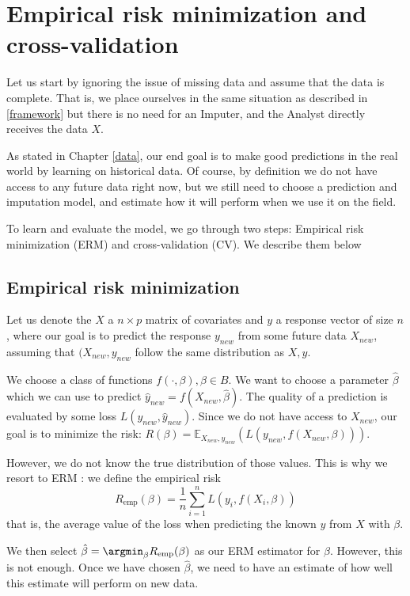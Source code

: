 	\section{Empirical risk minimization and cross-validation}
	\label{ERM}
Let us start by ignoring the issue of missing data and assume that the data is complete. That is, we place ourselves in the same situation as described in \ref{framework} but there is no need for an Imputer, and the Analyst directly receives the data $X$.
	
As stated in Chapter \ref{data}, our end goal is to make good predictions in the real world by learning on historical data. Of course, by definition we do not have access to any future data right now, but we still need to choose a prediction and imputation model, and estimate how it will perform when we use it on the field. 

To learn and evaluate the model, we go through two steps: Empirical risk minimization (ERM) and cross-validation (CV). We describe them below
		\subsection{Empirical risk minimization}
Let us denote the $X$ a $n \times p$ matrix of covariates and $y$ a response vector of size $n$, where our goal is to predict the response $y_{new}$ from some future data $X_{new}$, assuming that $(X_{new}, y_{new}$ follow the same distribution as $X,y$. 

We choose a class of functions $f(\cdot, \beta), \beta \in B$. We want to choose a parameter $\hat{\beta}$ which we can use to predict $\hat{y}_{new} = f(X_{new}, \hat{\beta})$.  The quality of a prediction is evaluated by some loss $L(y_{new},\hat{y}_{new})$. Since we do not have access to $X_{new}$, our goal is to minimize the risk: $R(\beta) = \mathbb{E}_{X_{new},y_{new}}(L(y_{new}, f(X_{new}, \beta)))$.

However, we do not know the true distribution of those values. This is why we resort to ERM \cite{ERM}: we define the empirical risk
$$ R_{\text{emp}}(\beta) = \frac{1}{n} \sum\limits_{i=1}^n L(y_i, f(X_i, \beta))$$
that is, the average value of the loss when predicting the known $y$  from $X$ with $\beta$.

We then select $\hat{\beta} = \argmin_{\beta} R_{\text{emp}}(\beta)$ as our ERM estimator for $\beta$. However, this is not enough. Once we have chosen $\hat{\beta}$, we need to have an estimate of how well this estimate will perform on new data.

